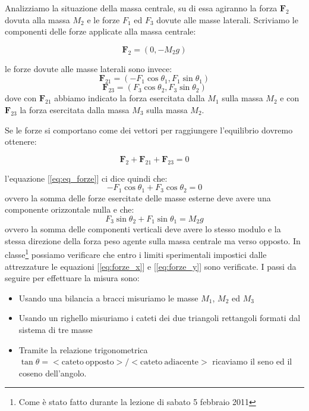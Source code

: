 \documentclass[a4paper,10pt,oneside]{article}
\begin{document}
 Analizziamo la situazione della massa centrale, su di essa agiranno  la forza $\mathbf{F}_2$ dovuta alla massa $M_2$ e le forze $F_1$ ed $F_3$ dovute alle masse laterali. Scriviamo le componenti delle forze applicate alla massa centrale:

\begin{equation}
 \mathbf{F}_2=(0,-M_2g)
\end{equation}

le forze dovute alle masse laterali sono invece:
\begin{equation}
 \mathbf{F}_{21}=(-F_1\cos \theta_1,F_1\sin\theta_1)
\end{equation}
\begin{equation}
 \mathbf{F}_{23}=(F_3\cos\theta_2,F_3\sin\theta_2)
\end{equation}
dove con $\mathbf{F}_{21}$ abbiamo indicato la forza esercitata dalla $M_1$ sulla massa $M_2$ e con $\mathbf{F}_{23}$ la forza esercitata dalla massa $M_3$ sulla massa $M_2$.

Se le forze si comportano come dei vettori per raggiungere l'equilibrio dovremo ottenere:

\begin{equation}\label{eq:eq_forze}
  \mathbf{F}_2+\mathbf{F}_{21}+\mathbf{F}_{23}=0
\end{equation}

l'equazione [\ref{eq:eq_forze}] ci dice quindi che:
\begin{equation}\label{eq:forze_x}
 -F_1\cos \theta_1+F_3\cos\theta_2=0
\end{equation}
ovvero la somma delle forze esercitate delle masse esterne deve avere una componente orizzontale nulla e che:
\begin{equation}\label{eq:forze_y}
 F_3\sin\theta_2+F_1\sin\theta_1=M_2g
\end{equation}
ovvero la somma delle componenti verticali deve avere lo stesso modulo e la stessa direzione della forza peso agente sulla massa centrale ma verso opposto.
In classe\footnote{Come è stato fatto durante la lezione di sabato 5 febbraio 2011} possiamo verificare che entro i limiti sperimentali impostici dalle attrezzature le equazioni [\ref{eq:forze_x}] e [\ref{eq:forze_y}] sono verificate. I passi da seguire per effettuare la misura sono:
\begin{itemize}
 \item Usando una bilancia a bracci misuriamo le masse $M_1$, $M_2$ ed $M_3$
 \item Usando un righello misuriamo i cateti dei due triangoli rettangoli formati dal sistema di tre masse
\item Tramite la relazione trigonometrica $\tan\theta=<\mathrm{cateto\ opposto}>/<\mathrm{cateto\ adiacente}>$ ricaviamo il seno ed il coseno dell'angolo.
\end{itemize}
\end{document}
